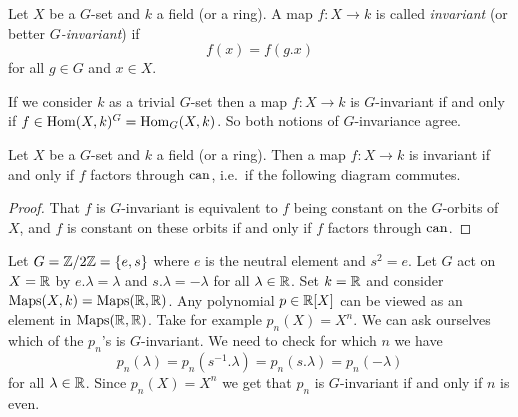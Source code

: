 \begin{defi}
  Let $X$ be a $G$-set and $k$ a field (or a ring). A map $f \colon X \to k$ is called \emph{invariant} (or better \emph{$G$-invariant}) if
  \[
    f(x) = f\left( g.x \right)
  \]
  for all $g \in G$ and $x \in X$.
\end{defi}


\begin{note}
  If we consider $k$ as a trivial $G$-set then a map $f \colon X \to k$ is $G$-invariant if and only if $f \in \operatorname{Hom}(X,k)^G = \operatorname{Hom}_G(X,k)$. So both notions of $G$-invariance agree.
\end{note}


\begin{lem}
  Let $X$ be a $G$-set and $k$ a field (or a ring). Then a map $f \colon X \to k$ is invariant if and only if $f$ factors through $\operatorname{can}$, i.e.\ if the following diagram commutes.
  \begin{center}
  \end{center}
\end{lem}
\begin{proof}
  That $f$ is $G$-invariant is equivalent to $f$ being constant on the $G$-orbits of $X$, and $f$ is constant on these orbits if and only if $f$ factors through $\operatorname{can}$.
\end{proof}


\begin{expl}
  Let $G = \mathbb{Z}/2\mathbb{Z} = \{e,s\}$ where $e$ is the neutral element and $s^2 = e$. Let $G$ act on $X = \mathbb{R}$ by $e.\lambda = \lambda$ and $s.\lambda = -\lambda$ for all $\lambda \in \mathbb{R}$. Set $k = \mathbb{R}$ and consider $\operatorname{Maps}(X,k) = \operatorname{Maps}(\mathbb{R},\mathbb{R})$. Any polynomial $p \in \mathbb{R}[X]$ can be viewed as an element in $\operatorname{Maps}(\mathbb{R},\mathbb{R})$. Take for example $p_n(X) = X^n$. We can ask ourselves which of the $p_n$’s is $G$-invariant. We need to check for which $n$ we have
  \[
    p_n(\lambda) = p_n\left(s^{-1}.\lambda\right) = p_n(s.\lambda) = p_n(-\lambda)
  \]
  for all $\lambda \in \mathbb{R}$. Since $p_n(X) = X^n$ we get that $p_n$ is $G$-invariant if and only if $n$ is even.
\end{expl}


